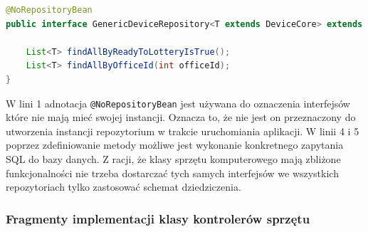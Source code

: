 \begin{lstlisting}[language=Java, style=JavaStyle,  caption={Generyczne repozytorium sprzętu komputerowego:  GenericDeviceRepository}, label={repo_genericDevice}]
@NoRepositoryBean
public interface GenericDeviceRepository<T extends DeviceCore> extends JpaRepository<T, Integer> {
    
    List<T> findAllByReadyToLotteryIsTrue();
    List<T> findAllByOfficeId(int officeId);
}
\end{lstlisting}

W lini 1 adnotacja \texttt{@NoRepositoryBean} jest używana do oznaczenia interfejsów które nie mają mieć swojej instancji. Oznacza to, że nie jest on przeznaczony do utworzenia instancji repozytorium w trakcie uruchomiania aplikacji. W linii 4 i 5 poprzez zdefiniowanie metody możliwe jest wykonanie konkretnego zapytania SQL do bazy danych. Z racji, że klasy sprzętu komputerowego mają zbliżone funkcjonalności nie trzeba dostarczać tych samych interfejsów we wszystkich repozytoriach tylko zastosować schemat dziedziczenia.

\subsubsection{Fragmenty implementacji klasy kontrolerów sprzętu}

